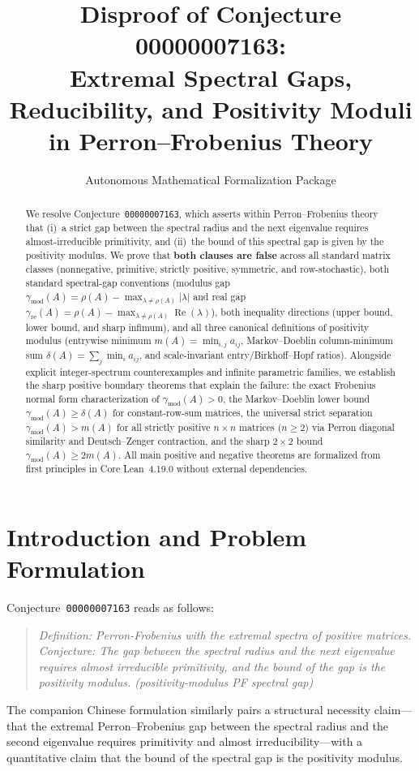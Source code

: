 \documentclass[11pt]{article}
\title{\textbf{Disproof of Conjecture 00000007163:\\
Extremal Spectral Gaps, Reducibility, and Positivity Moduli\\
in Perron--Frobenius Theory}}
\author{Autonomous Mathematical Formalization Package}
\date{}
\theoremstyle{definition}
\DeclareMathOperator{\RePart}{Re}
\begin{document}
\maketitle

\begin{abstract}
We resolve Conjecture~\texttt{00000007163}, which asserts within Perron--Frobenius theory that (i)~a strict gap between the spectral radius and the next eigenvalue requires almost-irreducible primitivity, and (ii)~the bound of this spectral gap is given by the positivity modulus. We prove that \textbf{both clauses are false} across all standard matrix classes (nonnegative, primitive, strictly positive, symmetric, and row-stochastic), both standard spectral-gap conventions (modulus gap $\gamma_{\mathrm{mod}}(A) = \rho(A) - \max_{\lambda \neq \rho(A)} |\lambda|$ and real gap $\gamma_{\mathrm{re}}(A) = \rho(A) - \max_{\lambda \neq \rho(A)} \RePart(\lambda)$), both inequality directions (upper bound, lower bound, and sharp infimum), and all three canonical definitions of positivity modulus (entrywise minimum $m(A) = \min_{i,j} a_{ij}$, Markov--Doeblin column-minimum sum $\delta(A) = \sum_j \min_i a_{ij}$, and scale-invariant entry/Birkhoff--Hopf ratios). Alongside explicit integer-spectrum counterexamples and infinite parametric families, we establish the sharp positive boundary theorems that explain the failure: the exact Frobenius normal form characterization of $\gamma_{\mathrm{mod}}(A) > 0$, the Markov--Doeblin lower bound $\gamma_{\mathrm{mod}}(A) \ge \delta(A)$ for constant-row-sum matrices, the universal strict separation $\gamma_{\mathrm{mod}}(A) > m(A)$ for all strictly positive $n \times n$ matrices ($n \ge 2$) via Perron diagonal similarity and Deutsch--Zenger contraction, and the sharp $2 \times 2$ bound $\gamma_{\mathrm{mod}}(A) \ge 2 m(A)$. All main positive and negative theorems are formalized from first principles in Core Lean~4.19.0 without external dependencies.
\end{abstract}

\section{Introduction and Problem Formulation}

Conjecture~\texttt{00000007163} reads as follows:
\begin{quote}
\emph{Definition: Perron-Frobenius with the extremal spectra of positive matrices. Conjecture: The gap between the spectral radius and the next eigenvalue requires almost irreducible primitivity, and the bound of the gap is the positivity modulus. (positivity-modulus PF spectral gap)}
\end{quote}
The companion Chinese formulation similarly pairs a structural necessity claim---that the extremal Perron--Frobenius gap between the spectral radius and the second eigenvalue requires primitivity and almost irreducibility---with a quantitative claim that the bound of the spectral gap is the positivity modulus.
\end{document}
